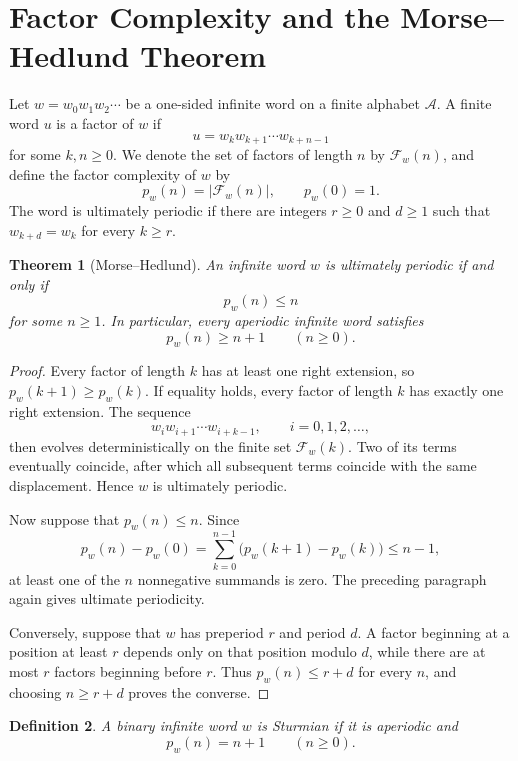 \documentclass{book}
\newtheorem{definition}{Definition}[section]
\newtheorem{theorem}[definition]{Theorem}
\begin{document}
\section{Factor Complexity and the Morse--Hedlund Theorem}

Let \(w=w_0w_1w_2\cdots\) be a one-sided infinite word on a finite alphabet
\(\mathcal A\).  A finite word \(u\) is a \textnormal{factor} of \(w\) if
\[
  u=w_kw_{k+1}\cdots w_{k+n-1}
\]
for some \(k,n\geq0\).  We denote the set of factors of length \(n\) by
\(\mathcal F_w(n)\), and define the \textnormal{factor complexity} of \(w\)
by
\[
  p_w(n)=\lvert\mathcal F_w(n)\rvert,
  \qquad p_w(0)=1.
\]
The word is \textnormal{ultimately periodic} if there are integers
\(r\geq0\) and \(d\geq1\) such that \(w_{k+d}=w_k\) for every \(k\geq r\).

\begin{theorem}[Morse--Hedlund]\label{theorem:MorseHedlundComplexity}
  An infinite word \(w\) is ultimately periodic if and only if
  \[
    p_w(n)\leq n
  \]
  for some \(n\geq1\).  In particular, every aperiodic infinite word
  satisfies
  \[
    p_w(n)\geq n+1
    \qquad(n\geq0).
  \]
\end{theorem}
\begin{proof}
  Every factor of length \(k\) has at least one right extension, so
  \(p_w(k+1)\geq p_w(k)\).  If equality holds, every factor of length
  \(k\) has exactly one right extension.  The sequence
  \[
    w_iw_{i+1}\cdots w_{i+k-1},
    \qquad i=0,1,2,\ldots,
  \]
  then evolves deterministically on the finite set \(\mathcal F_w(k)\).
  Two of its terms eventually coincide, after which all subsequent terms
  coincide with the same displacement.  Hence \(w\) is ultimately
  periodic.

  Now suppose that \(p_w(n)\leq n\).  Since
  \[
    p_w(n)-p_w(0)
    =\sum_{k=0}^{n-1}\bigl(p_w(k+1)-p_w(k)\bigr)\leq n-1,
  \]
  at least one of the \(n\) nonnegative summands is zero.  The preceding
  paragraph again gives ultimate periodicity.

  Conversely, suppose that \(w\) has preperiod \(r\) and period \(d\).
  A factor beginning at a position at least \(r\) depends only on that
  position modulo \(d\), while there are at most \(r\) factors beginning
  before \(r\).  Thus \(p_w(n)\leq r+d\) for every \(n\), and choosing
  \(n\geq r+d\) proves the converse.
\end{proof}

\begin{definition}
  A binary infinite word \(w\) is \textnormal{Sturmian} if it is aperiodic
  and
  \[
    p_w(n)=n+1
    \qquad(n\geq0).
  \]
\end{definition}
\end{document}
